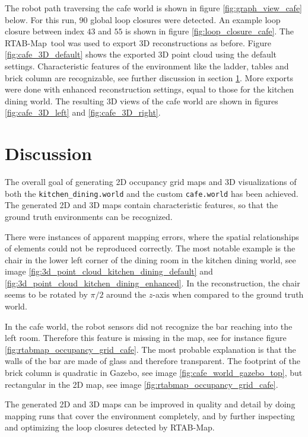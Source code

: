 \documentclass[10pt, journal, compsoc]{IEEEtran}
\newcommand{\rtab}{RTAB-Map}
\begin{document}
The robot path traversing the cafe world is shown in figure \ref{fig:graph_view_cafe} below. For this run, $90$ global loop closures were detected. An example loop closure between index $43$ and $55$ is shown in figure \ref{fig:loop_closure_cafe}. The \rtab\ tool was used to export 3D reconstructions as before. Figure \ref{fig:cafe_3D_default} shows the exported 3D point cloud using the default settings. Characteristic features of the environment like the ladder, tables and brick column are recognizable, see further discussion in section \ref{sec:discussion}. More exports were done with enhanced reconstruction settings, equal to those for the kitchen dining world. The resulting 3D views of the cafe world are shown in figures \ref{fig:cafe_3D_left} and \ref{fig:cafe_3D_right}.

\section{Discussion}
\label{sec:discussion}
The overall goal of generating 2D occupancy grid maps and 3D visualizations of both the \texttt{kitchen\_dining.world} and the custom \texttt{cafe.world} has been achieved. The generated 2D and 3D maps contain characteristic features, so that the ground truth environments can be recognized. 

There were instances of apparent mapping errors, where the spatial relationships of elements could not be reproduced correctly. The most notable example is the chair in the lower left corner of the dining room in the kitchen dining world, see image \ref{fig:3d_point_cloud_kitchen_dining_default} and \ref{fig:3d_point_cloud_kitchen_dining_enhanced}. In the reconstruction, the chair seems to be rotated by $\pi/2$ around the $z$-axis when compared to the ground truth world.

In the cafe world, the robot sensors did not recognize the bar reaching into the left room. Therefore this feature is missing in the map, see for instance figure \ref{fig:rtabmap_occupancy_grid_cafe}. The most probable explanation is that the walls of the bar are made of glass and therefore transparent. The footprint of the brick column is quadratic in Gazebo, see image \ref{fig:cafe_world_gazebo_top}, but rectangular in the 2D map, see image \ref{fig:rtabmap_occupancy_grid_cafe}.

The generated 2D and 3D maps can be improved in quality and detail by doing mapping runs that cover the environment completely, and by further inspecting and optimizing the loop closures detected by \rtab .
\end{document}
